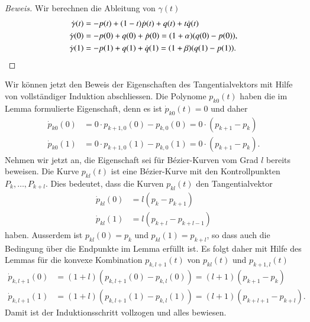\begin{proof}[Beweis]
Wir berechnen die Ableitung von $\gamma(t)$
\begin{align*}
\dot{\gamma}(t)
&=
-p(t) + (1-t)\dot{p}(t) + q(t) + t\dot{q}(t)
\\
\dot{\gamma}(0)
&=
-p(0) + q(0) + \dot{p}(0)
=
(1+\alpha)(q(0)-p(0)),
\\
\dot{\gamma}(1)&=-p(1) + q(1) + \dot{q}(1)
=
(1+\beta)(q(1)-p(1)).
\qedhere
\end{align*}
\end{proof}

Wir können jetzt den Beweis der Eigenschaften des Tangentialvektors
mit Hilfe von vollständiger Induktion abschliessen.
Die Polynome $p_{k0}(t)$ haben die im Lemma formulierte Eigenschaft,
denn es ist
$\dot{p}_{k0}(t) = 0$
und daher
\begin{align*}
\dot{p}_{k0}(0)
&=
0\cdot p_{k+1,0}(0) - p_{k,0}(0) = 0\cdot(p_{k+1}-p_{k})
\\
\dot{p}_{k0}(1)
&=
0\cdot p_{k+1,0}(1) - p_{k,0}(1) = 0\cdot(p_{k+1}-p_{k}).
\end{align*}
Nehmen wir jetzt an, die Eigenschaft sei für Bézier-Kurven vom Grad $l$
bereits beweisen.
Die Kurve $p_{kl}(t)$ ist eine Bézier-Kurve mit den Kontrollpunkten
$P_k,\dots,P_{k+l}$.
Dies bedeutet, dass die Kurven $p_{kl}(t)$ den Tangentialvektor
\begin{align*}
\dot{p}_{kl}(0)&= l(p_{k}-p_{k+1}) \\
\dot{p}_{kl}(1)&= l(p_{k+l}-p_{k+l-1})
\end{align*}
haben.
Ausserdem ist $p_{kl}(0) = p_k$ und $p_{kl}(1) = p_{k+l}$, so dass auch
die Bedingung über die Endpunkte im Lemma erfüllt ist.
Es folgt daher mit Hilfe des Lemmas für die konvexe Kombination $p_{k,l+1}(t)$
von $p_{kl}(t)$ und $p_{k+1,l}(t)$
\begin{align*}
\dot{p}_{k,l+1}(0)
&=
(1+l)(p_{k,l+1}(0) - p_{k,l}(0))
=
(l+1)(p_{k+1} - p_{k})
\\
\dot{p}_{k,l+1}(1)
&=
(1+l)(p_{k,l+1}(1) - p_{k,l}(1))
=
(l+1)(p_{k+l+1}-p_{k+l}).
\end{align*}
Damit ist der Induktionsschritt vollzogen und alles bewiesen.

